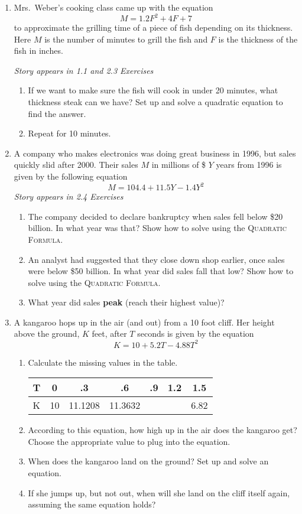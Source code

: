 \begin{enumerate}
\item Mrs.\ Weber's cooking class came up with the equation $$M = 1.2F^2+4F+7$$ to approximate the grilling time of a piece of fish depending on its thickness.  Here $M$ is the number of minutes to grill the fish and $F$ is the thickness of the fish in inches.  

\hfill \emph{Story appears in 1.1 and 2.3 Exercises}
\begin{enumerate}
\item If we want to make sure the fish will cook in under 20 minutes, what thickness steak can we have? Set up and solve a quadratic equation to find the answer.
\item Repeat for 10 minutes. 
\end{enumerate}

\item A company who makes electronics was doing great business in 1996, but sales quickly slid after 2000.  Their sales $M$ in millions of \$ $Y$ years from 1996 is given by the following equation $$M = 104.4+11.5Y-1.4Y^2$$
\hfill \emph{Story appears in 2.4 Exercises}
\begin{enumerate}
\item The company decided to declare bankruptcy when sales fell below \$20 billion.  In what year was that?    Show how to solve using the \textsc{Quadratic Formula.}
\item An analyst had suggested that they close down shop earlier, once sales were below \$50 billion.  In what year did sales fall that low? Show how to solve using the \textsc{Quadratic Formula.}
\item What year did sales \textbf{peak} (reach their highest value)?  
\end{enumerate} 

\item A kangaroo hops up in the air (and out) from a 10 foot cliff.  Her height above the ground, $K$ feet, after $T$ seconds is given by the equation $$K = 10 + 5.2T - 4.88T^2$$ 
\begin{enumerate}
\item Calculate the missing values in the table. 
\begin{center}
\begin{tabular} {|l|c|c|c|c|c|c|} \hline
T & 0 & .3 & .6 & .9 & 1.2 & 1.5 \\ \hline
K& 10 & 11.1208 & 11.3632  &  \hspace{.4in}    &  \hspace{.4in}   &6.82  \\ \hline
\end{tabular}
\end{center}
\item According to this equation, how high up in the air does the kangaroo get? 
Choose the appropriate value to plug into the equation.
\item When does the kangaroo land on the ground? 
Set up and solve an equation.
\item If she jumps up, but not out, when will she land on the cliff itself again, assuming the same equation holds?
\end{enumerate}

\end{enumerate}

